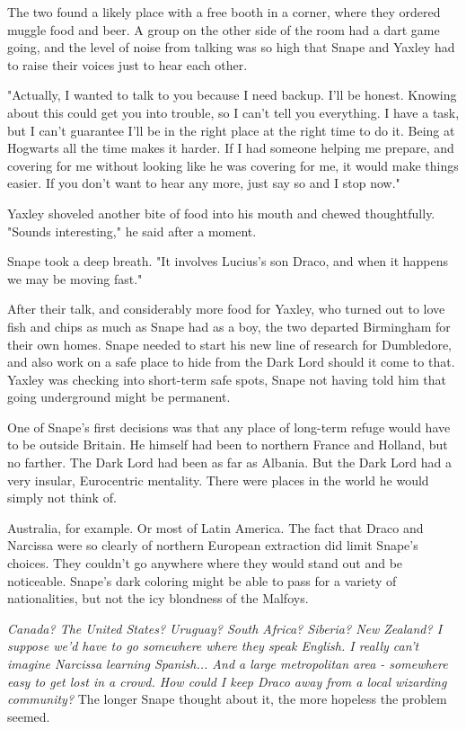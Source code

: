 \documentclass[a4paper,11pt]{article}
\begin{document}
The two found a likely place with a free booth in a corner, where they ordered muggle food and beer. A group on the other side of the room had a dart game going, and the level of noise from talking was so high that Snape and Yaxley had to raise their voices just to hear each other.

"Actually, I wanted to talk to you because I need backup. I'll be honest. Knowing about this could get you into trouble, so I can't tell you everything. I have a task, but I can't guarantee I'll be in the right place at the right time to do it. Being at Hogwarts all the time makes it harder. If I had someone helping me prepare, and covering for me without looking like he was covering for me, it would make things easier. If you don't want to hear any more, just say so and I stop now."

Yaxley shoveled another bite of food into his mouth and chewed thoughtfully. "Sounds interesting," he said after a moment.

Snape took a deep breath. "It involves Lucius's son Draco, and when it happens we may be moving fast."

After their talk, and considerably more food for Yaxley, who turned out to love fish and chips as much as Snape had as a boy, the two departed Birmingham for their own homes. Snape needed to start his new line of research for Dumbledore, and also work on a safe place to hide from the Dark Lord should it come to that. Yaxley was checking into short-term safe spots, Snape not having told him that going underground might be permanent.

One of Snape's first decisions was that any place of long-term refuge would have to be outside Britain. He himself had been to northern France and Holland, but no farther. The Dark Lord had been as far as Albania. But the Dark Lord had a very insular, Eurocentric mentality. There were places in the world he would simply not think of.

Australia, for example. Or most of Latin America. The fact that Draco and Narcissa were so clearly of northern European extraction did limit Snape's choices. They couldn't go anywhere where they would stand out and be noticeable. Snape's dark coloring might be able to pass for a variety of nationalities, but not the icy blondness of the Malfoys.

\emph{Canada? The United States? Uruguay? South Africa? Siberia? New Zealand? I suppose we'd have to go somewhere where they speak English. I really can't imagine Narcissa learning Spanish... And a large metropolitan area - somewhere easy to get lost in a crowd. How could I keep Draco away from a local wizarding community?} The longer Snape thought about it, the more hopeless the problem seemed.
\end{document}

